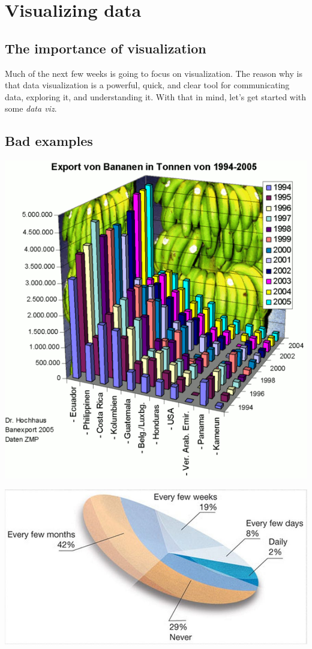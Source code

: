 \documentclass[
]{book}
\begin{document}
\hypertarget{dataviz}{%
\chapter{Visualizing data}\label{dataviz}}

\hypertarget{the-importance-of-visualization}{%
\section{The importance of visualization}\label{the-importance-of-visualization}}

Much of the next few weeks is going to focus on visualization. The reason why is that data visualization is a powerful, quick, and clear tool for communicating data, exploring it, and understanding it. With that in mind, let's get started with some \emph{data viz}.

\hypertarget{bad-examples}{%
\section{Bad examples}\label{bad-examples}}

\includegraphics{img/vis1.png}

\includegraphics{img/vis2.jpeg}
\end{document}
